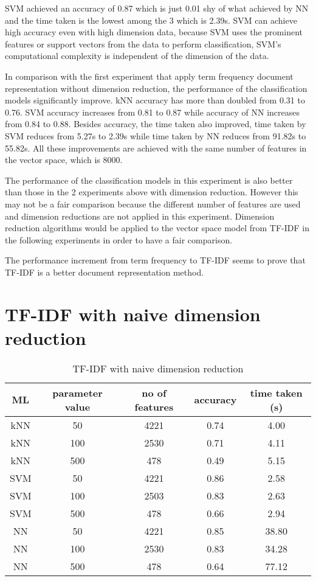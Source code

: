 SVM achieved an accuracy of 0.87 which is just 0.01 shy of what achieved by NN and the time taken is the lowest among the 3 which is 2.39s. SVM can achieve high accuracy even with high dimension data, because SVM uses the prominent features or support vectors from the data to perform classification, SVM's computational complexity is independent of the dimension of the data. \cite{dimRedCat}

In comparison with the first experiment that apply term frequency document representation without dimension reduction, the performance of the classification models significantly improve. kNN accuracy has more than doubled from 0.31 to 0.76. SVM accuracy increases from 0.81 to 0.87 while accuracy of NN increases from  0.84 to 0.88. Besides accuracy, the time taken also improved, time taken by SVM reduces from 5.27s to 2.39s while time taken by NN reduces from 91.82s to 55.82s. All these improvements are achieved with the same number of features in the vector space, which is 8000. 

The performance of the classification models in this experiment is also better than those in the 2 experiments above with dimension reduction. However this may not be a fair comparison because the different number of features are used and dimension reductions are not applied in this experiment. Dimension reduction algorithms would be applied to the vector space model from TF-IDF in the following experiments in order to have a fair comparison.

The performance increment from term frequency to TF-IDF seems to prove that TF-IDF is a better document representation method.\\

\clearpage
\section{TF-IDF with naive dimension reduction}

\begin{table} [ht]
	\centering
	\begin{tabular}{|| c | c | c | c | c||}
		\hline
		ML & parameter value & no of features & accuracy & time taken (s) \\ [0.5ex]
		\hline\hline
		kNN & 50 & 4221 & 0.74 & 4.00 \\ 
		\hline
		kNN & 100 & 2530 & 0.71 & 4.11 \\ 
		\hline
		kNN & 500 & 478 & 0.49 & 5.15 \\ 
		\hline\hline
		SVM & 50 & 4221 & 0.86 & 2.58 \\
		\hline
		SVM & 100 & 2503 & 0.83 & 2.63 \\
		\hline
		SVM & 500 & 478 & 0.66 & 2.94 \\
		\hline\hline
		NN & 50 & 4221 & 0.85 & 38.80 \\
		\hline
		NN & 100 & 2530 & 0.83 & 34.28 \\
		\hline
		NN & 500 & 478 & 0.64 & 77.12 \\
		\hline
	\end{tabular}
\caption{TF-IDF with naive dimension reduction}
\label{tbl:tfidfNaive}
\end{table}

